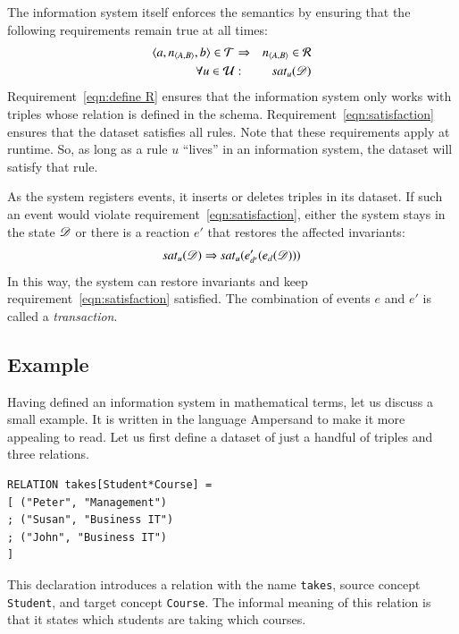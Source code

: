 \documentclass{elsarticle}
\begin{document}
   The information system itself enforces the semantics by ensuring that the following requirements remain true at all times:
\begin{eqnarray}
   \langle{a},{\text{\it n\/}_{\langle{A},{B}\rangle}},{b}\rangle\in\mathcal{T}&\Rightarrow&\text{\it n\/}_{\langle{A},{B}\rangle}\in\mathcal{R}
   \label{eqn:define R}\\
   \forall u\in\mathcal{U}&:&\text{\it sat\/}_{u}(\mathscr{D})
   \label{eqn:satisfaction}
\end{eqnarray}
   Requirement~\ref{eqn:define R} ensures that the information system only works with triples whose relation is defined in the schema.
   Requirement~\ref{eqn:satisfaction} ensures that the dataset satisfies all rules.
   Note that these requirements apply at runtime.
   So, as long as a rule $u$ ``lives'' in an information system, the dataset will satisfy that rule.

   As the system registers events, it inserts or deletes triples in its dataset.
   If such an event would violate requirement~\ref{eqn:satisfaction},
   either the system stays in the state $\mathscr{D}$ or there is a reaction $e'$ that restores the affected invariants:
\begin{equation}
   \text{\it sat\/}_{u}(\mathscr{D})\Rightarrow\text{\it sat\/}_{u}(e'_{d'}(e_{d}(\mathscr{D})))
   \label{eqn:restoring}
\end{equation}
   In this way, the system can restore invariants and keep requirement~\ref{eqn:satisfaction} satisfied.
   The combination of events $e$ and $e'$ is called a {\em transaction}.

\subsection{Example}
\label{sct:Example existing IS}
   Having defined an information system in mathematical terms, let us discuss a small example.
   It is written in the language Ampersand to make it more appealing to read.
   Let us first define a dataset of just a handful of triples and three relations.
\begin{verbatim}
RELATION takes[Student*Course] =
[ ("Peter", "Management")
; ("Susan", "Business IT")
; ("John", "Business IT")
]
\end{verbatim}
   This declaration introduces a relation with the name \verb#takes#,
   source concept \verb#Student#, and
   target concept \verb#Course#.
   The informal meaning of this relation is that it states which students are taking which courses.
\end{document}
